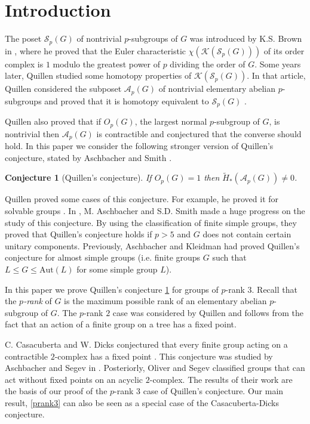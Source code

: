 \documentclass[11pt,twoside,reqno]{amsart}
\theoremstyle{plain}
\newtheorem{conjecture}[theorem]{Conjecture}
\theoremstyle{definition}
\theoremstyle{remark}
\def\wt{\widetilde}
\def\Aut{\mathrm{Aut}}
\def\A{\mathcal{A}}
\def\K{\mathcal{K}}
\def\S{\mathcal{S}}
\begin{document}
\section{Introduction}

The poset $\S_p(G)$ of nontrivial $p$-subgroups of $G$ was introduced by K.S. Brown in \cite{Brown}, where he proved that the Euler characteristic $\chi(\K(\S_p(G)))$ of its order complex is $1$ modulo the greatest power of $p$ dividing the order of $G$.
Some years later, Quillen \cite{Q} studied some homotopy properties of $\K(\S_p(G))$.
In that article, Quillen considered the subposet $\A_p(G)$ of nontrivial elementary abelian $p$-subgroups and proved that it is homotopy equivalent to $\S_p(G)$ \cite[Proposition 2.1]{Q}.

Quillen also proved that if $O_p(G)$, the largest normal $p$-subgroup of $G$,  is nontrivial then $\A_p(G)$ is contractible \cite[Proposition 2.4]{Q} and conjectured that the converse should hold.
In this paper we consider the following stronger version of Quillen's conjecture, stated by Aschbacher and Smith \cite{AschbacherSmith}.

\begin{conjecture}[Quillen's conjecture]\label{QCAschbacherSmith}
If $O_p(G)=1$ then $\wt{H}_*(\A_p(G))\neq 0$.
\end{conjecture}

Quillen proved some cases of this conjecture.
For example, he proved it for solvable groups \cite[Theorem 12.1]{Q}.
In \cite{AschbacherSmith}, M. Aschbacher and S.D. Smith made a huge progress on the study of this conjecture.
By using the classification of finite simple groups, they proved that Quillen's conjecture holds if $p>5$ and $G$ does not contain certain unitary components.
Previously, Aschbacher and Kleidman \cite{AK} had proved Quillen's conjecture for almost simple groups (i.e. finite groups $G$ such that $L\leq G\leq \Aut(L)$ for some simple group $L$).

In this paper we prove Quillen's conjecture \ref{QCAschbacherSmith} for groups of $p$-rank $3$.
Recall that the \textit{$p$-rank} of $G$ is the maximum possible rank of an elementary abelian $p$-subgroup of $G$.
The $p$-rank $2$ case was considered by Quillen \cite[Proposition 2.10]{Q} and follows from the fact that an action of a finite group on a tree has a fixed point.

C. Casacuberta and W. Dicks conjectured that every finite group acting on a contractible $2$-complex has a fixed point \cite{CD}.
This conjecture was studied by Aschbacher and Segev in \cite{AschbacherSegev}.
Posteriorly, Oliver and Segev classified groups that can act without fixed points on an acyclic $2$-complex. The results of their work \cite{OS} are the basis of our proof of the $p$-rank $3$ case of Quillen's conjecture. Our main result, \cref{prank3} can also be seen as a special case of the Casacuberta-Dicks conjecture.
\end{document}
